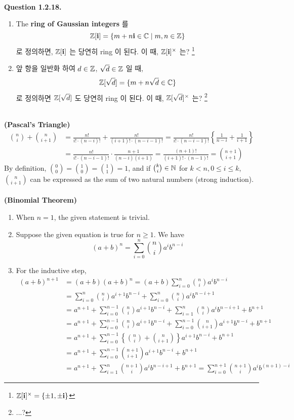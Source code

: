 \\
\textbf{\sffamily Question 1.2.18.}
\begin{enumerate}
	\item The \textbf{ring of Gaussian integers} 를 $$\mathbb{Z}[\mathrm{\mathbf{i}}] = \{m+n \mathrm{\mathbf{i}} \in \mathbb{C} \mid m, n\in \mathbb{Z}\}$$ 로 정의하면, $\mathbb{Z}[\mathrm{\mathbf{i}}]$ 는 당연히 ring 이 된다. 이 때, $\mathbb{Z}[\mathrm{\mathbf{i}}]^\times$ 는? \footnote{$\mathbb{Z}[\mathrm{\mathbf{i}}]^\times = \{\pm 1, \pm\mathrm{\mathbf{i}}\}$}
	\item 앞 항을 일반화 하여 $d\in \mathbb{Z}$, $\sqrt{d}\in \mathbb{Z}$ 일 때, $$\mathbb{Z}[\sqrt{d}] = \{m+n\sqrt{d} \in \mathbb{C}\}$$ 로 정의하면 $\mathbb{Z}[\sqrt{d}]$ 도 당연히 ring 이 된다. 이 때, $\mathbb{Z}[\sqrt{d}]^\times$ 는? \footnote{...?}
\end{enumerate}~
\\
 \textbf{(Pascal's Triangle)} ~
$$\begin{aligned}
{n\choose i} + {n\choose i + 1}  &= \frac{n!}{i!\cdot(n-i)!} + \frac{n!}{(i+1)!\cdot(n-i-1)!} = \frac{n!}{i!\cdot (n-i-1)!} \left\{\frac{1}{n-i} + \frac{1}{i+1}\right\}\\
&=\frac{n!}{i!\cdot(n-i-1)!}\cdot \frac{n+1}{(n-i)(i+1)} = \frac{(n+1)!}{(i+1)!\cdot (n-1)!} = {n + 1\choose i+1}
\end{aligned}$$
By definition, ${0\choose 0} = {1\choose 0} = {1\choose 1} = 1$, and if ${k\choose i} \in \mathbb{N}$ for $k < n, 0\leq i \leq k$, ${n\choose i+1}$ can be expressed as the sum of two natural numbers (strong induction).\\
\\
 \textbf{(Binomial Theorem)}
\begin{enumerate}
	\item When $n = 1$, the given statement is trivial.
	\item Suppose the given equation is true for $n\geq 1$. We have
	$$(a+b)^n = \sum_{i=0}^n {n\choose i} a^i b^{n-i}$$
	\item For the inductive step,
	$$
	\begin{aligned}
		(a+b)^{n+1} &= (a+b)(a+b)^n = (a+b)\sum_{i=0}^n {n\choose i} a^i b^{n-i} \\ &= \sum_{i=0}^n {n\choose i} a^{i+1} b^{n-i} + \sum_{i=0}^n {n\choose i} a^i b^{n-i+1} \\
		&= a^{n+1} + \sum_{i=0}^{n-1} {n\choose i} a^{i+1} b^{n-i} + \sum_{i=1}^n {n\choose i} a^i b^{n-i+1} + b^{n+1} \\
		&= a^{n+1} + \sum_{i=0}^{n-1} {n\choose i} a^{i+1} b^{n-i} + \sum_{i=0}^{n-1} {n\choose i+1} a^{i+1} b^{n-i} + b^{n+1} \\
		&= a^{n+1} + \sum_{i=0}^{n-1} \left\{{n\choose i} + {n\choose i+1}\right\} a^{i+1} b^{n-i}  + b^{n+1} \\
		&= a^{n+1} + \sum_{i=0}^{n-1} {n+1\choose i+1} a^{i+1} b^{n-i}  + b^{n+1} \\
		&= a^{n+1} + \sum_{i=1}^{n} {n+1\choose i} a^{i} b^{n-i + 1}  + b^{n+1} = \sum_{i=0}^{n+1} {n+1\choose i} a^i b^{(n+1)-i}
	\end{aligned}
	$$
\end{enumerate}
